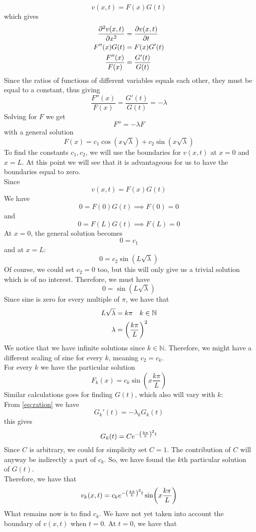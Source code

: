 \documentclass[12pt,english,a4paper]{article}
\begin{document}
\[
v(x,t) = F(x)G(t)
\]
which gives
\begin{align}
\pdv[2]{v(x,t)}{x} &= \pdv{v(x,t)}{t} \nonumber \\
F''(x)G(t) &= F(x)G'(t) \nonumber \\
\frac{F''(x)}{F(x)} &= \frac{G'(t)}{G(t)} \label{eq:ration}
\end{align}
Since the ratios of functions of different variables equals each other, they must be equal to a constant, thus giving
\[
\frac{F''(x)}{F(x)} = \frac{G'(t)}{G(t)} = -\lambda
\]
Solving for \(F\) we get
\[
	F'' = -\lambda F
\]
with a general solution
\[
F(x) = c_1\cos(x\sqrt{\lambda} ) + c_2\sin(x\sqrt{\lambda})
\]
To find the constants \(c_1,c_2\), we will use the boundaries for \(v(x,t)\) at \(x = 0\) and \(x = L\). At this point we will see that it is advantageous for us to have the boundaries equal to zero.\\
Since
\[
v(x,t) = F(x)G(t)
\]
We have
\[
0 = F(0)G(t) \implies F(0) = 0
\]
and
\[
0 = F(L)G(t) \implies F(L) = 0
\]
At \(x = 0\), the general solution becomes
\[
0 = c_1
\]
and at \(x = L\):
\[
0 =  c_2\sin(L\sqrt{\lambda})
\]
Of course, we could set \(c_2 = 0\) too, but this will only give us a trivial solution which is of no interest. Therefore, we must have
\[
0 = \sin(L\sqrt{\lambda})
\]
Since sine is zero for every multiple of \(\pi\), we have that
\begin{align*}
L\sqrt{\lambda} &= k\pi \quad k\in \mathbb{N}\\
\lambda &= \qty(\frac{k \pi}{L})^2
\end{align*}
We notice that we have infinite solutions since \(k \in \mathbb{N}\). Therefore, we might have a different scaling of sine for every \(k\), meaning \(c_2 = c_k\).\\  For every \(k\) we have the particular solution
\[
F_k(x) = c_k\sin(x\frac{k \pi}{L})
\]
Similar calculations goes for finding \(G(t)\), which also will vary with \(k\):\\
From \vref{eq:ration} we have
\[
G_k'(t) = -\lambda_k G_k(t)
\]
this gives
\[
G_k(t) = Ce^{-\qty(\frac{k \pi}{L})^2t}
\]
Since \(C\) is arbitrary, we could for simplicity set \( C = 1\). The contribution of \(C\) will anyway be indirectly a part of  \(c_k\).
So, we have found the \(k\)th particular solution of \(G(t)\). \\
Therefore, we have that
\[
v_k(x,t) = c_ke^{-\qty(\frac{k \pi}{L})^2t}\sin(x\frac{k \pi}{L})
\]
What remains now is to find \(c_k\). We have not yet taken into account the boundary of \(v(x,t)\) when \(t = 0\). At \(t = 0\), we have that
\end{document}
